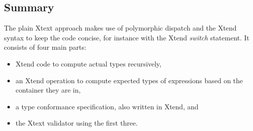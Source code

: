

\subsection{Summary}
The plain Xtext approach makes use of polymorphic dispatch and the Xtend syntax to keep the code concise, for instance with the Xtend \emph{switch} statement. It consists of four main parts:
\begin{itemize}
\item Xtend code to compute actual types recursively,
\item an Xtend operation to compute expected types of expressions based on the container they are in,
\item a type conformance specification, also written in Xtend, and
\item the Xtext validator using the first three.
\end{itemize}

